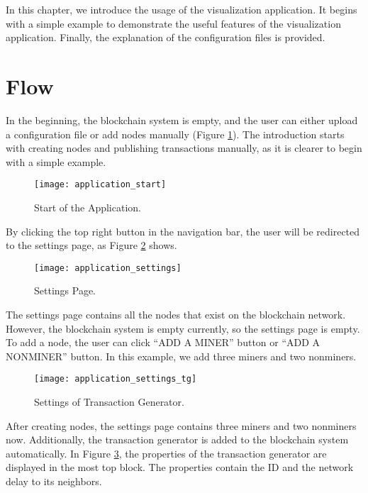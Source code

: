 In this chapter, we introduce the usage of the visualization application. It begins with a simple example to demonstrate the useful features of the visualization application. Finally, the explanation of the configuration files is provided.

\section{Flow}
\label{sec:flow}

In the beginning, the blockchain system is empty, and the user can either upload a configuration file or add nodes manually (Figure \ref{fig:start of the application}). The introduction starts with creating nodes and publishing transactions manually, as it is clearer to begin with a simple example.

\begin{figure}[htb]
    \centering
    \texttt{[image: application\_start]}
    \caption{Start of the Application.}
    \label{fig:start of the application}
\end{figure}

By clicking the top right button in the navigation bar, the user will be redirected to the settings page, as Figure \ref{fig:settings page} shows.

\begin{figure}[htb]
    \centering
    \texttt{[image: application\_settings]}
    \caption{Settings Page.}
    \label{fig:settings page}
\end{figure}

The settings page contains all the nodes that exist on the blockchain network. However, the blockchain system is empty currently, so the settings page is empty. To add a node, the user can click ``ADD A MINER'' button or ``ADD A NONMINER'' button. In this example, we add three miners and two nonminers.

\begin{figure}[htb]
    \centering
    \texttt{[image: application\_settings\_tg]}
    \caption{Settings of Transaction Generator.}
    \label{fig:settings of transaction generator}
\end{figure}

After creating nodes, the settings page contains three miners and two nonminers now. Additionally, the transaction generator is added to the blockchain system automatically. In Figure \ref{fig:settings of transaction generator}, the properties of the transaction generator are displayed in the most top block. The properties contain the ID and the network delay to its neighbors.

